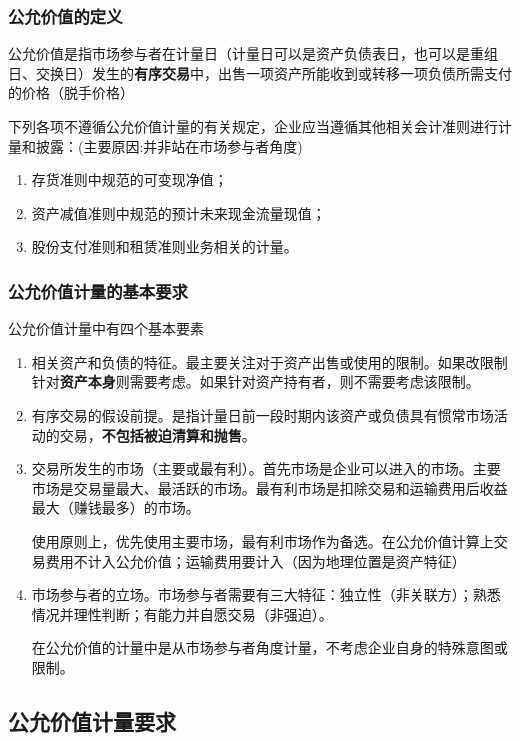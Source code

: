 \documentclass[UTF8,12pt]{ctexart}
\numberwithin{equation}{section} %
\numberwithin{figure}{section}
\numberwithin{table}{section}
\begin{document}
	\subsubsection{公允价值的定义}
	公允价值是指市场参与者在计量日（计量日可以是资产负债表日，也可以是重组日、交换日）发生的\textbf{有序交易}中，出售一项资产所能收到或转移一项负债所需支付的价格（脱手价格）
	
	下列各项不遵循公允价值计量的有关规定，企业应当遵循其他相关会计准则进行计量和披露：(主要原因:并非站在市场参与者角度)
	\begin{enumerate}
		\item 存货准则中规范的可变现净值；
		
		\item 资产减值准则中规范的预计未来现金流量现值；
		
		\item 股份支付准则和租赁准则业务相关的计量。
	\end{enumerate}
	
	\subsubsection{公允价值计量的基本要求}
	公允价值计量中有四个基本要素
	\begin{enumerate}
		\item 相关资产和负债的特征。最主要关注对于资产出售或使用的限制。如果改限制针对\textbf{资产本身}则需要考虑。如果针对资产持有者，则不需要考虑该限制。
		
		\item 有序交易的假设前提。是指计量日前一段时期内该资产或负债具有惯常市场活动的交易，\textbf{不包括被迫清算和抛售}。
		
		\item 交易所发生的市场（主要或最有利）。首先市场是企业可以进入的市场。主要市场是交易量最大、最活跃的市场。最有利市场是扣除交易和运输费用后收益最大（赚钱最多）的市场。
		
		使用原则上，优先使用主要市场，最有利市场作为备选。在公允价值计算上交易费用不计入公允价值；运输费用要计入（因为地理位置是资产特征）
		
		\item 市场参与者的立场。市场参与者需要有三大特征：独立性（非关联方）；熟悉情况并理性判断；有能力并自愿交易（非强迫）。
		
		在公允价值的计量中是从市场参与者角度计量，不考虑企业自身的特殊意图或限制。
	\end{enumerate}
	

	\subsection{公允价值计量要求}
\end{document}
